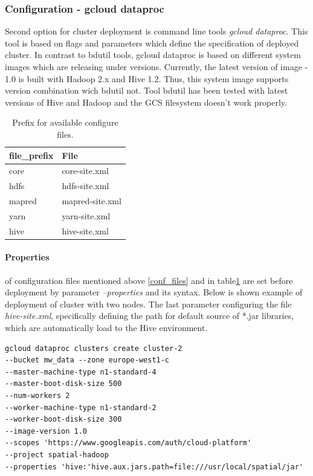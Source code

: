 \documentclass[a4paper,12pt,oneside]{report}
\begin{document}
	
	
	
	\subsubsection{Configuration - gcloud dataproc}
    Second option for cluster deployment is command line tools \textit{gcloud
    	dataproc}. This tool is based on flags and parameters which define the specification
    of deployed cluster. In contrast to bdutil tools, gcloud dataproc is based on
    different system images which are releasing under versions. Currently, the latest
    version of image - 1.0 is built with Hadoop 2.x and Hive 1.2. Thus, this system image 
    supports version combination wich bdutil not. Tool bdutil has been tested with latest 
    versions of Hive and Hadoop and the GCS filesystem doesn’t work properly.  
	\begin{table}[!htbp]
		\centering
		\begin{scriptsize}
			\begin{tabular}{@{}|l|l|@{}}
				\toprule 
				file\_prefix & File            \\ \midrule \midrule
				core         & core-site.xml   \\ \midrule
				hdfs         & hdfs-site.xml   \\ \midrule
				mapred       & mapred-site.xml \\ \midrule
				yarn         & yarn-site.xml   \\ \midrule
				hive         & hive-site.xml   \\ \bottomrule
			\end{tabular}
		\end{scriptsize}
		\caption{Prefix for available configure files.}
		\label{config_table}
	\end{table}
	\paragraph{Properties} of configuration files mentioned above \ref{conf_files}
	and in table\ref{config_table} are set before deployment by parameter
	\textit{--properties} and its syntax. Below is shown example of deployment of cluster
	with two nodes. The last parameter configuring the file \textit{hive-site.xml}, 
	specifically defining the path for default source of *.jar libraries, which are
	automatically load to the Hive environment. \cite{gcloud_dataproc}
	\begin{footnotesize}
		\begin{lstlisting}[style=python]
gcloud dataproc clusters create cluster-2 
--bucket mw_data --zone europe-west1-c
--master-machine-type n1-standard-4 
--master-boot-disk-size 500 
--num-workers 2
--worker-machine-type n1-standard-2 
--worker-boot-disk-size 300 
--image-version 1.0 
--scopes 'https://www.googleapis.com/auth/cloud-platform' 
--project spatial-hadoop
--properties 'hive:'hive.aux.jars.path=file:///usr/local/spatial/jar'
		\end{lstlisting}
	\end{footnotesize}
    
\end{document}

